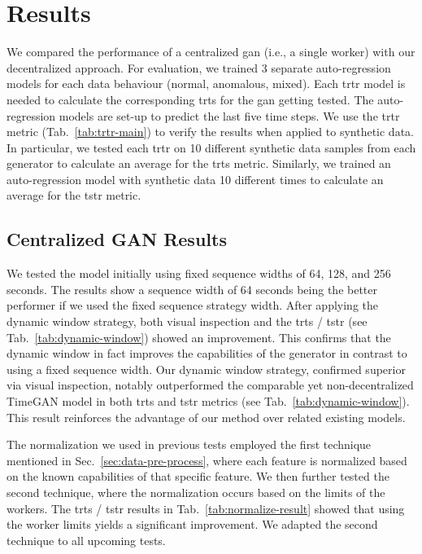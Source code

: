 \section{Results}


We compared the performance of a centralized \gls*{gan} (i.e., a single worker) with our decentralized approach. For evaluation, we trained 3 separate auto-regression models for each data behaviour (normal, anomalous, mixed). Each \gls*{trtr} model is needed to calculate the corresponding \gls*{trts} for the \gls*{gan} getting tested. The auto-regression models are set-up to predict the last five time steps.
%
We use the \gls*{trtr} metric (Tab.~\ref{tab:trtr-main}) to verify the results when applied to synthetic data. In particular, we tested each \gls*{trtr} on 10 different synthetic data samples from each generator to calculate an average for the \gls*{trts} metric. Similarly, we trained an auto-regression model with synthetic data 10 different times to calculate an average for the \gls*{tstr} metric.


\subsection{Centralized GAN Results}

We tested the model initially using fixed sequence widths of 64, 128, and 256 seconds. The results show a sequence width of 64 seconds being the better performer if we used the fixed sequence strategy width. After applying the dynamic window strategy, both visual inspection and the \gls*{trts} / \gls*{tstr} (see Tab.~\ref{tab:dynamic-window}) showed an improvement. This confirms that the dynamic window in fact improves the capabilities of the generator in contrast to using a fixed sequence width. Our dynamic window strategy, confirmed superior via visual inspection, notably outperformed the comparable yet non-decentralized TimeGAN model in both \gls*{trts} and \gls*{tstr} metrics (see Tab.~\ref{tab:dynamic-window}). This result reinforces the advantage of our method over related existing models.


%
The normalization we used in previous tests employed the first technique mentioned in Sec.~\ref{sec:data-pre-process}, where each feature is normalized based on the known capabilities of that specific feature. We then further tested the second technique, where the normalization occurs based on the limits of the workers. The \gls*{trts} / \gls*{tstr} results in Tab.~\ref{tab:normalize-result} showed that using the worker limits yields a significant improvement. We adapted the second technique to all upcoming tests.



